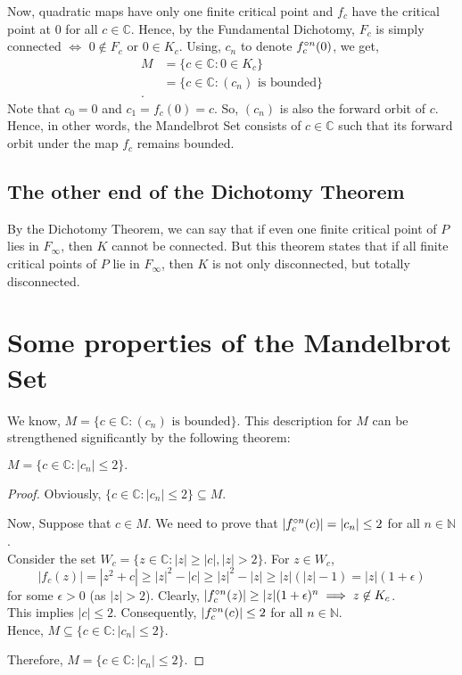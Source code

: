 Now, quadratic maps have only one finite critical point and \( f_c \) have the critical point at \( 0 \) for all \( c\in \mathbb{C} \).
Hence, by the Fundamental Dichotomy, \( F_c \) is simply connected \( \iff \) \( 0\not\in F_c \) or \( 0\in K_c \). Using, \( c_n \) to denote \( \fcof[n](0) \),
we get,
\begin{align*}
	M&=\{c\in \mathbb{C}:0\in K_c\}\\
	 &=\{c\in \mathbb{C}:(c_n)\text{ is bounded}\}\\
.\end{align*}
Note that \( c_0=0 \) and \( c_1=f_c(0)=c \). So, \( (c_n) \) is also the forward orbit of \( c \). Hence, in other words,
the Mandelbrot Set consists of \( c\in \mathbb{C} \) such that its forward orbit under the map \( f_c \)
remains bounded.

\subsection{The other end of the Dichotomy Theorem}
By the Dichotomy Theorem, we can say that if even one finite critical point of \( P \) lies in \( F_\infty \), then \( K \)
cannot be connected. But this theorem states that if all finite critical points of \( P \) lie in \( F_\infty \), then
\( K \) is not only disconnected, but totally disconnected.

\section{Some properties of the Mandelbrot Set}
We know, \( M=\{c\in \mathbb{C}:(c_n)\text{ is bounded}\} \). 
This description for \( M \) can be strengthened significantly by the following theorem:
\begin{theorem}\label{thm4.1}
	\( M=\{c\in \mathbb{C}:|c_n|\le 2 \}.\)
\end{theorem}
\begin{proof}Obviously, \( \{c\in \mathbb{C}:|c_n|\le 2\}  \subseteq M\).

	Now, Suppose that \( c\in M \). We need to prove that \( |\fcof[n](c)|=|c_n|\le 2 \) for all \( n\in \mathbb{N} \).\\
	Consider the set \( W_c=\{z\in \mathbb{C}:|z|\ge |c|,|z|>2\} \). For \( z\in W_c \),\[
		|f_c(z)|=|z^2+c|\ge |z|^2-|c|\ge |z|^2-|z|\ge |z|(|z|-1)=|z|(1+\epsilon)
	\] for some \( \epsilon>0 \) (as \( |z|>2 \)). Clearly, \( |\fcof[n](z)|\ge |z|(1+\epsilon)^n \implies z\not\in K_c\).\\
	This implies \( |c|\le 2 \). Consequently, \( |\fcof[n](c)|\le 2 \) for all \( n\in \mathbb{N} \).\\
	Hence, \( M\subseteq  \{c\in \mathbb{C}:|c_n|\le 2 \} \).

	Therefore, \( M=\{c\in \mathbb{C}:|c_n|\le 2\} \).
\end{proof}

